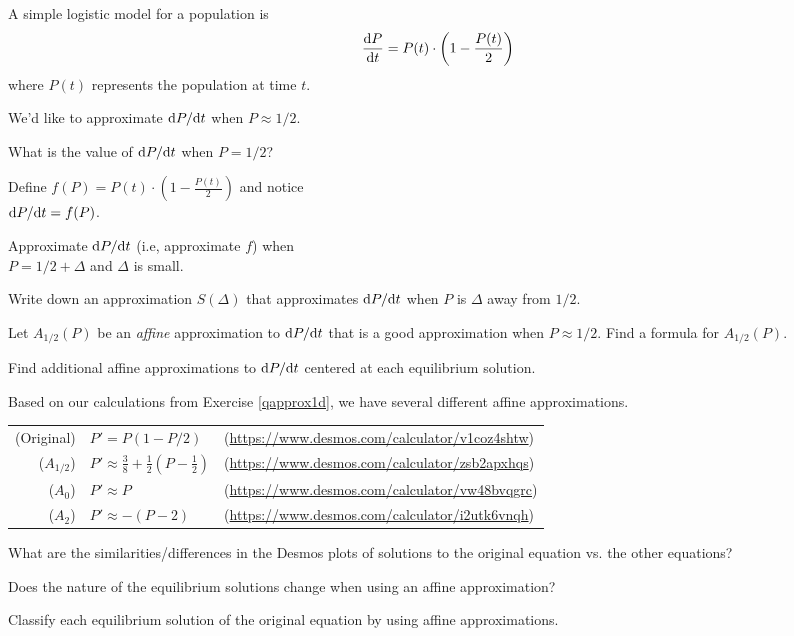 \documentclass{workbook}
\begin{document}
\begin{slide}
	\question\label{qapprox1d}
	A simple logistic model for a population is
	\[
		\frac{\mathrm{d} P}{\mathrm{d} t} = P(t)\cdot\left(1-\frac{P(t)}{2}\right)
	\]
	where $P(t)$ represents the population at time $t$.
	
	We'd like to approximate $\mathrm{d} P/\mathrm{d} t$ when $P\approx 1/2$.
	\begin{parts}
		\item What is the value of $\mathrm{d} P/\mathrm{d} t$ when $P=1/2$?
		
		\item %
			Define $f(P)=P(t)\cdot\left(1-\frac{P(t)}{2}\right)$ and notice\\ $\mathrm{d} P/\mathrm{d} t = f(P)$.

		Approximate $\mathrm{d} P/\mathrm{d} t$ (i.e, approximate $f$) when\\ $P=1/2+\Delta$ and $\Delta$ is small.

		\bigskip
		\item Write down an approximation $S(\Delta)$ that approximates $\mathrm{d} P/\mathrm{d} t$ when $P$ is $\Delta$ away from $1/2$.
		\item 
		
		Let $A_{1/2}(P)$ be an \emph{affine} approximation to $\mathrm{d} P/\mathrm{d} t$ that is a good approximation when $P\approx 1/2$.
		Find a formula for $A_{1/2}(P)$.
		\item Find additional affine approximations to $\mathrm{d} P/\mathrm{d} t$ centered at each equilibrium solution.
		\vspace{1cm}
		\phantom{x}
	\end{parts}
\end{slide}

\begin{slide}
	\question
	Based on our calculations from Exercise \ref{qapprox1d}, we have several different affine approximations.

	\begin{tabular}{rll}
		(Original) & $P'=P(1-P/2)$
		& ({\small \url{https://www.desmos.com/calculator/v1coz4shtw}})\\
		($A_{1/2}$) & $P'\approx \frac{3}{8}+\frac{1}{2}(P-\frac{1}{2})$
		& ({\small \url{https://www.desmos.com/calculator/zsb2apxhqs}})\\
		($A_0$) & $P'\approx P$
		& ({\small \url{https://www.desmos.com/calculator/vw48bvqgrc}})\\
		($A_2$) & $P'\approx -(P-2)$
		& ({\small \url{https://www.desmos.com/calculator/i2utk6vnqh}})\\

	\end{tabular}
	
	\begin{parts}
		\item What are the similarities/differences in the Desmos plots of solutions
		to the original equation vs. the other equations?
		\item Does the nature of the equilibrium solutions change when using an affine approximation?
		\item Classify each equilibrium solution of the original equation by using affine approximations.
	\end{parts}
\end{slide}
\end{document}
